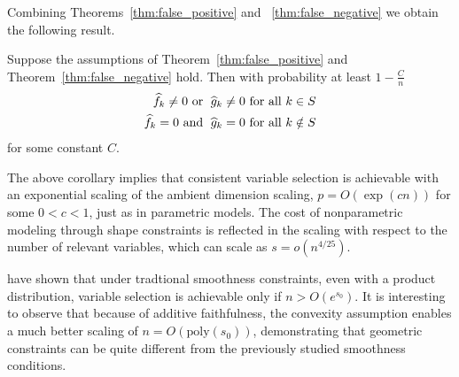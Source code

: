 Combining Theorems~\ref{thm:false_positive} and
~\ref{thm:false_negative} 
we obtain the following result.
\begin{corollary}
  Suppose the assumptions of Theorem~\ref{thm:false_positive} and
  Theorem~\ref{thm:false_negative} hold.  
Then with probability at least $1-\frac{C}{n}$
\begin{align}
\widehat{f}_k \neq 0 \textrm{ or }\; \widehat{g}_k \neq 0 &\textrm{ for all } k \in S\\
\widehat{f}_k = 0 \textrm{ and }\; \widehat{g}_k = 0 & \textrm{ for all } k \notin S
\end{align}
for some constant $C$.

\end{corollary}
The above corollary implies that consistent variable selection is
achievable with an exponential scaling of the ambient dimension
scaling, $p = O(\exp(cn))$ for some $0<c<1$, just as in parametric models.
The cost of nonparametric modeling through shape constraints is
reflected in the scaling with respect to the number of relevant
variables, which can scale as $s = o(n^{4/25})$.

\begin{remark}
  \citet{dalalyan:12} have shown that under tradtional smoothness
  constraints, even with a product distribution, variable selection is
  achievable only if $n > O(e^{s_0})$. It is interesting to observe that
  because of additive faithfulness, the convexity assumption enables a
  much better scaling of $n = O(\textrm{poly}(s_0))$, demonstrating that
  geometric constraints can be quite different from the previously
  studied smoothness conditions.
\end{remark}



 
